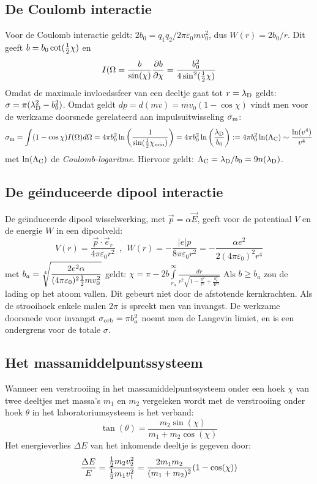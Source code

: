 \subsection{De Coulomb interactie}
Voor de Coulomb interactie geldt: $2b_0=q_1q_2/2\pi\varepsilon_0mv_0^2$, dus
$W(r)=2b_0/r$. Dit geeft $b=b_0\cot(\mbox{$\frac{1}{2}$}\chi)$ en
\[
I(\Omega=\frac{b}{\sin(\chi)}\frac{\partial b}{\partial \chi}=\frac{b_0^2}{4\sin^2(\mbox{$\frac{1}{2}$}\chi)}
\]
Omdat de maximale invloedssfeer van een deeltje gaat tot $r=\lambda_{\rm D}$
geldt: $\sigma=\pi(\lambda_{\rm D}^2-b_0^2)$. Omdat geldt
$dp=d(mv)=mv_0(1-\cos\chi)$ vindt men  voor de werkzame doorsnede gerelateerd
aan impulsuitwisseling $\sigma_{\rm m}$:
\[
\sigma_{\rm m}=\int(1-\cos\chi)I(\Omega)d\Omega=4\pi b_0^2\ln\left(\frac{1}{\sin(\mbox{$\frac{1}{2}$}\chi_{\rm min})}\right)=
4\pi b_0^2\ln\left(\frac{\lambda_{\rm D}}{b_0}\right):=4\pi b_0^2\ln(\Lambda_{\rm C})
\sim\frac{\ln(v^4)}{v^4}
\]
met $\ln(\Lambda_{\rm C})$ de {\it Coulomb-logaritme}. Hiervoor geldt:
$\Lambda_{\rm C}=\lambda_{\rm D}/b_0=9n(\lambda_{\rm D})$.

\subsection{De ge\"{\i}nduceerde dipool interactie}
De ge\"{\i}nduceerde dipool wisselwerking, met $\vec{p}=\alpha\vec{E}$,
geeft voor de potentiaal $V$ en de energie $W$ in een dipoolveld:
\[
V(r)=\frac{\vec{p}\cdot\vec{e}_r}{4\pi\varepsilon_0r^2}~~,~~
W(r)=-\frac{|e|p}{8\pi\varepsilon_0 r^2}=-\frac{\alpha e^2}{2(4\pi\varepsilon_0)^2r^4}
\]
met
$\displaystyle b_a=\sqrt[4]{\frac{2e^2\alpha}{(4\pi\varepsilon_0)^2\mbox{$\frac{1}{2}$} mv_0^2}}$
geldt:
$\displaystyle\chi=\pi-2b\int\limits_{r_a}^\infty \frac{dr}{r^2\sqrt{\displaystyle 1-\frac{b^2}{r^2}+\frac{b_a^4}{4r^4}}}$
\npar
Als $b\geq b_a$ zou de lading op het atoom vallen. Dit gebeurt niet door de
afstotende kernkrachten. Als de strooihoek enkele malen $2\pi$ is spreekt men
van invangst. De werkzame doorsnede voor invangst $\sigma_{\rm orb}=\pi b_a^2$
noemt men de Langevin limiet, en is een ondergrens voor de totale $\sigma$.

\subsection{Het massamiddelpuntssysteem}
Wanneer een verstrooiing in het massamiddelpuntssysteem onder een hoek $\chi$
van twee deeltjes met massa's $m_1$ en $m_2$ vergeleken wordt met de
verstrooiing onder hoek $\theta$ in het laboratoriumsysteem is het verband:
\[
\tan(\theta)=\frac{m_2\sin(\chi)}{m_1+m_2\cos(\chi)}
\]
Het energieverlies $\Delta E$ van het inkomende deeltje is gegeven door:
\[
\frac{\Delta E}{E}=\frac{\mbox{$\frac{1}{2}$} m_2v_2^2}{\mbox{$\frac{1}{2}$} m_1v_1^2}=\frac{2m_1m_2}{(m_1+m_2)^2}(1-\cos(\chi))
\]

